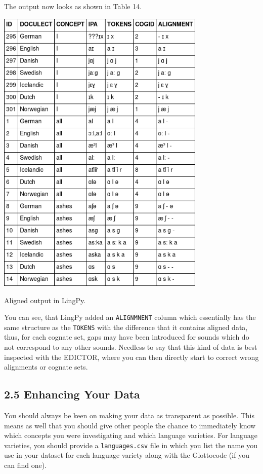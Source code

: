 \documentclass[a4paper,svgnames]{scrartcl}
\begin{document}
The output now looks as shown in Table 14.

\begin{table}
\centering
\includegraphics[width=0.75\textwidth]{images/table-14.png}
\caption{Aligned output in LingPy.}
\end{table}

You can see, that LingPy added an \texttt{ALIGNMNENT} column which
essentially has the same structure as the \texttt{TOKENS} with the
difference that it contains aligned data, thus, for each cognate set,
gaps may have been introduced for sounds which do not correspond to any
other sounds. Needless to say that this kind of data is best inspected
with the EDICTOR, where you can then directly start to correct wrong
alignments or cognate sets.

\subsection*{2.5 Enhancing Your Data}\label{enhancing-your-data}

You should always be keen on making your data as transparent as
possible. This means as well that you should give other people the
chance to immediately know which concepts you were investigating and
which language varieties. For language varieties, you should provide a
\texttt{languages.csv} file in which you list the name you use in your
dataset for each language variety along with the Glottocode (if you can
find one).
\end{document}
